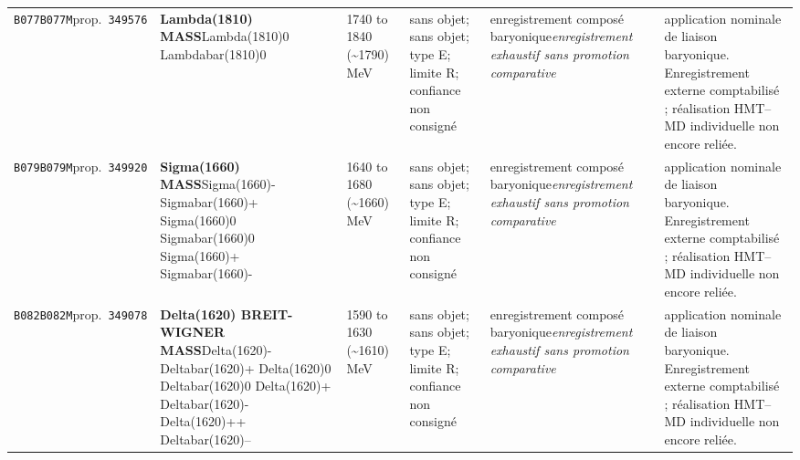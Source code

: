 \begin{landscape}
\begin{longtable}{L{1.85cm}L{4.45cm}L{2.35cm}L{4.05cm}L{3.35cm}L{7.15cm}}
\texttt{B077}\newline \texttt{B077M}\newline prop.\ \texttt{349576} & \textbf{Lambda(1810) MASS}\newline Lambda(1810)0 \textbar{}\allowbreak{} Lambdabar(1810)0 & 1740 to 1840 (\textasciitilde{}1790)\,MeV & sans objet; sans objet; type E; limite R; confiance non consigné & enregistrement composé baryonique\newline \emph{enregistrement exhaustif sans promotion comparative} & application nominale de liaison baryonique. Enregistrement externe comptabilisé ; réalisation HMT--MD individuelle non encore reliée. \\
\texttt{B079}\newline \texttt{B079M}\newline prop.\ \texttt{349920} & \textbf{Sigma(1660) MASS}\newline Sigma(1660)- \textbar{}\allowbreak{} Sigmabar(1660)+ \textbar{}\allowbreak{} Sigma(1660)0 \textbar{}\allowbreak{} Sigmabar(1660)0 \textbar{}\allowbreak{} Sigma(1660)+ \textbar{}\allowbreak{} Sigmabar(1660)- & 1640 to 1680 (\textasciitilde{}1660)\,MeV & sans objet; sans objet; type E; limite R; confiance non consigné & enregistrement composé baryonique\newline \emph{enregistrement exhaustif sans promotion comparative} & application nominale de liaison baryonique. Enregistrement externe comptabilisé ; réalisation HMT--MD individuelle non encore reliée. \\
\texttt{B082}\newline \texttt{B082M}\newline prop.\ \texttt{349078} & \textbf{Delta(1620) BREIT-WIGNER MASS}\newline Delta(1620)- \textbar{}\allowbreak{} Deltabar(1620)+ \textbar{}\allowbreak{} Delta(1620)0 \textbar{}\allowbreak{} Deltabar(1620)0 \textbar{}\allowbreak{} Delta(1620)+ \textbar{}\allowbreak{} Deltabar(1620)- \textbar{}\allowbreak{} Delta(1620)++ \textbar{}\allowbreak{} Deltabar(1620)-- & 1590 to 1630 (\textasciitilde{}1610)\,MeV & sans objet; sans objet; type E; limite R; confiance non consigné & enregistrement composé baryonique\newline \emph{enregistrement exhaustif sans promotion comparative} & application nominale de liaison baryonique. Enregistrement externe comptabilisé ; réalisation HMT--MD individuelle non encore reliée. \\

\end{longtable}
\end{landscape}
